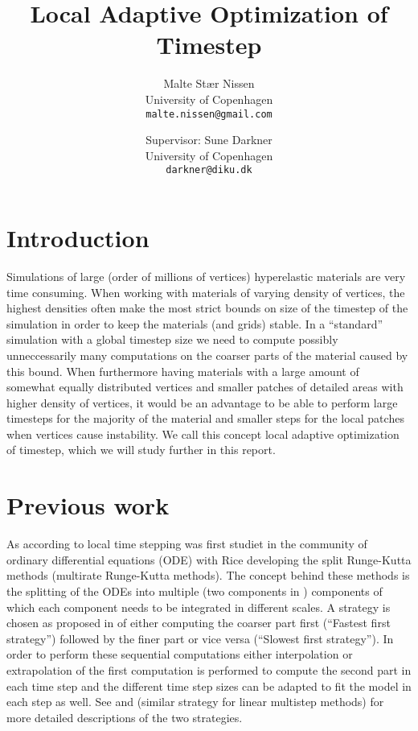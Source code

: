 \documentclass[11pt,a4paper]{article}
\title{Local Adaptive Optimization of Timestep}
\author{Malte Stær Nissen\\University of Copenhagen\\\texttt{malte.nissen@gmail.com} \and Supervisor: Sune Darkner\\University of Copenhagen\\\texttt{darkner@diku.dk}}
\begin{document}
\maketitle

\tableofcontents

\clearpage

\section{Introduction}
Simulations of large (order of millions of vertices) hyperelastic materials are
very time consuming. When working with materials of varying density of vertices,
the highest densities often make the most strict bounds on size of the timestep
of the simulation in order to keep the materials (and grids) stable. In a
``standard'' simulation with a global timestep size we need to compute possibly
unneccessarily many computations on the coarser parts of the material caused by this bound. When
furthermore having materials with a large amount of somewhat equally distributed
vertices and smaller patches of detailed areas with higher density of vertices,
it would be an advantage to be able to perform large timesteps for the majority of
the material and smaller steps for the local patches when vertices cause
instability. We call this concept local adaptive optimization of timestep, which
we will study further in this report.

\section{Previous work}
As according to \cite{Gander:2013} local time stepping was first studiet
in the community of ordinary differential equations (ODE) with Rice
\cite{rice:1960} developing the split Runge-Kutta methods (multirate
Runge-Kutta methods). The concept behind these methods is the splitting of
the ODEs into multiple (two components in \cite{rice:1960}) components of
which each component needs to be integrated in different scales. A strategy
is chosen as proposed in \cite{Kvaernoe:1999} of either computing the coarser
part first (``Fastest first strategy'') followed by the finer part or vice
versa (``Slowest first strategy''). In order to perform these sequential
computations either interpolation or extrapolation of the first computation
is performed to compute the second part in each time step and the different
time step sizes can be adapted to fit the model in each step as well. See
\cite{Kvaernoe:1999} and \cite{Gear:1984} (similar strategy for linear
multistep methods) for more detailed descriptions of the two strategies.
\end{document}
